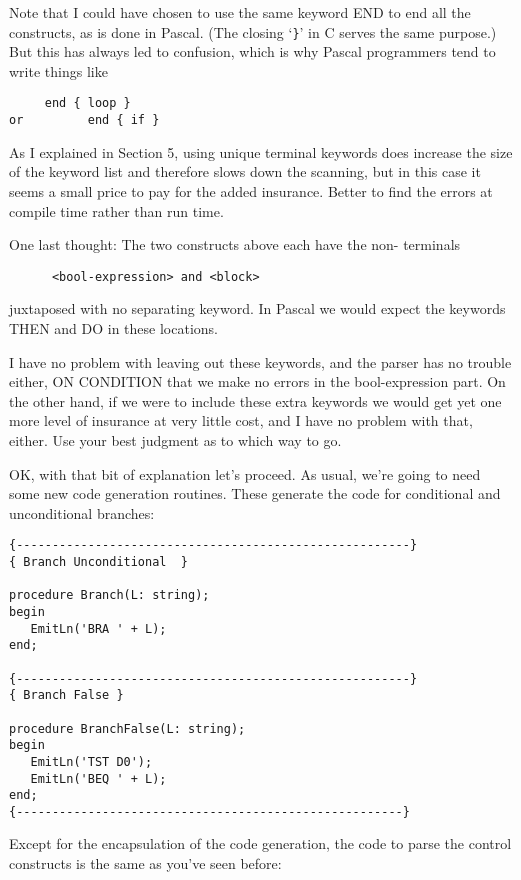 Note  that I could have chosen to use the same keyword END to end all  the constructs, as is done in Pascal. (The closing `\verb|}|' in C serves the same purpose.)  But this has always led  to confusion, which is why Pascal programmers tend to write things like

\begin{verbatim}
     end { loop }
or         end { if }
\end{verbatim}

As I explained in Section 5, using  unique terminal keywords does increase  the  size  of the keyword list and therefore slows down the  scanning, but in this case it seems a small price to pay for the added insurance. Better  to find the errors at compile time rather than run time.

One last thought:  The two constructs above each  have  the  non- terminals

\begin{verbatim}
      <bool-expression> and <block>
\end{verbatim}

juxtaposed with no separating keyword. In Pascal we would expect the keywords THEN and DO in these locations.

I have no problem with leaving out these keywords, and the parser has no trouble either, ON CONDITION that we make no errors in the bool-expression part. On  the  other hand, if we were to include these extra keywords we would get yet one more level of insurance at very little  cost, and  I  have no problem with that, either. Use your best judgment as to which way to go.

OK, with that bit of explanation let's proceed. As  usual, we're going to need some new  code generation routines. These generate the code for conditional and unconditional branches:

\begin{verbatim}
{-------------------------------------------------------}
{ Branch Unconditional  }

procedure Branch(L: string);
begin
   EmitLn('BRA ' + L);
end;

{-------------------------------------------------------}
{ Branch False }

procedure BranchFalse(L: string);
begin
   EmitLn('TST D0');
   EmitLn('BEQ ' + L);
end;
{------------------------------------------------------}
\end{verbatim}

Except for the encapsulation of  the code generation, the code to parse the control constructs is the same as you've seen before:

